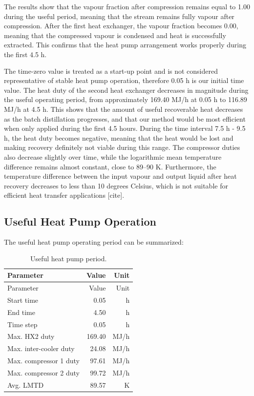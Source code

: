 The results show that the vapour fraction after compression remains
equal to 1.00 during the useful period, meaning that the stream remains
fully vapour after compression. After the first heat exchanger, the
vapour fraction becomes 0.00, meaning that the compressed vapour is
condensed and heat is successfully extracted. This confirms that the
heat pump arrangement works properly during the first 4.5 h.

The time-zero value is treated as a start-up point and is not considered
representative of stable heat pump operation, therefore 0.05 h is our
initial time value. The heat duty of the second heat exchanger decreases
in magnitude during the useful operating period, from approximately
169.40 MJ/h at 0.05 h to 116.89 MJ/h at 4.5 h. This shows that the
amount of useful recoverable heat decreases as the batch distillation
progresses, and that our method would be most efficient when only
applied during the first 4.5 hours. During the time interval 7.5 h - 9.5
h, the heat duty becomes negative, meaning that the heat would be lost
and making recovery definitely not viable during this range. The
compressor duties also decrease slightly over time, while the
logarithmic mean temperature difference remains almost constant, close
to 89--90 K. Furthermore, the temperature difference between the input
vapour and output liquid after heat recovery decreases to less than 10
degrees Celsius, which is not suitable for efficient heat transfer
applications {[}cite{]}.

\subsection{Useful Heat Pump
Operation}\label{useful-heat-pump-operation}

The useful heat pump operating period can be summarized:

\begin{longtable}[]{@{}lrr@{}}
\caption{Useful heat pump period.
\label{tab:Useful heat pump period}}\tabularnewline
\toprule\noalign{}
Parameter & Value & Unit \\
\midrule\noalign{}
\endfirsthead
\toprule\noalign{}
Parameter & Value & Unit \\
\midrule\noalign{}
\endhead
\bottomrule\noalign{}
\endlastfoot
Start time & 0.05 & h \\
End time & 4.50 & h \\
Time step & 0.05 & h \\
Max. HX2 duty & 169.40 & MJ/h \\
Max. inter-cooler duty & 24.08 & MJ/h \\
Max. compressor 1 duty & 97.61 & MJ/h \\
Max. compressor 2 duty & 99.72 & MJ/h \\
Avg. LMTD & 89.57 & K \\
\end{longtable}

